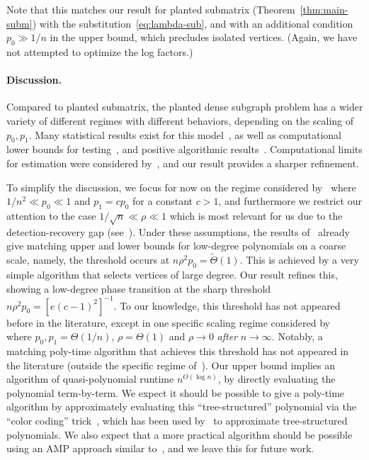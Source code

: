 \documentclass[11pt]{article}
\begin{document}
\noindent Note that this matches our result for planted submatrix (Theorem~\ref{thm:main-subm}) with the substitution~\eqref{eq:lambda-sub}, and with an additional condition $p_0 \gg 1/n$ in the upper bound, which precludes isolated vertices. (Again, we have not attempted to optimize the log factors.)



\paragraph{Discussion.}

Compared to planted submatrix, the planted dense subgraph problem has a wider variety of different regimes with different behaviors, depending on the scaling of $p_0,p_1$. Many statistical results exist for this model~\cite{AV-info,VA-info,CX-info}, as well as computational lower bounds for testing~\cite{HWX-reduction}, and positive algorithmic results~\cite{log-density,ames-convex,CX-info,one-community-sparse}. Computational limits for estimation were considered by~\cite{SW-estimation}, and our result provides a sharper refinement.

To simplify the discussion, we focus for now on the regime considered by~\cite{HWX-reduction} where $1/n^2 \ll p_0 \ll 1$ and $p_1 = c p_0$ for a constant $c > 1$, and furthermore we restrict our attention to the case $1/\sqrt{n} \ll \rho \ll 1$ which is most relevant for us due to the detection-recovery gap (see~\cite[Conjecture~2.2]{BBH-reduction}). Under these assumptions, the results of~\cite{SW-estimation} already give matching upper and lower bounds for low-degree polynomials on a coarse scale, namely, the threshold occurs at $n \rho^2 p_0 = \tilde\Theta(1)$. This is achieved by a very simple algorithm that selects vertices of large degree. Our result refines this, showing a low-degree phase transition at the sharp threshold $n \rho^2 p_0 = [e(c-1)^2]^{-1}$. To our knowledge, this threshold has not appeared before in the literature, except in one specific scaling regime considered by~\cite{one-community-sparse} where $p_0,p_1 = \Theta(1/n)$, $\rho = \Theta(1)$ and $\rho\to 0$ \emph{after} $n\to\infty$. Notably, a matching poly-time algorithm that achieves this threshold has not appeared in the literature (outside the specific regime of~\cite{one-community-sparse}). Our upper bound implies an algorithm of quasi-polynomial runtime $n^{O(\log n)}$, by directly evaluating the polynomial term-by-term. We expect it should be possible to give a poly-time algorithm by approximately evaluating this ``tree-structured'' polynomial via the ``color coding'' trick~\cite{color-coding,HS-bayesian}, which has been used by~\cite{graph-match-trees,graph-match-otter} to approximate tree-structured polynomials. We also expect that a more practical algorithm should be possible using an AMP approach similar to~\cite{clique-e,submatrix-amp}, and we leave this for future work.
\end{document}
